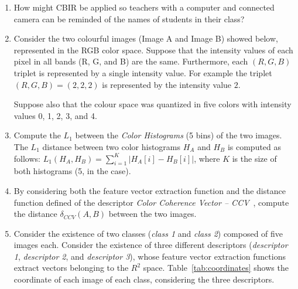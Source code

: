 \begin{enumerate}
\item
How might CBIR be applied so teachers with a computer and connected camera can be reminded of the names of students in their class?

\item Consider the two colourful images (Image A and Image B) showed below, represented in the RGB color space. Suppose that the intensity values of each pixel in all bands (R, G, and B) are the same. Furthermore, each $(R,G,B)$ triplet is represented by a single intensity value. For example the triplet $(R,G,B)= (2,2,2)$ is represented by the intensity value $2$.

Suppose also that the colour space was quantized in five colors with intensity values 0, 1, 2, 3, and 4.

\item Compute the $L_1$ between the {\em Color Histograms} (5
  bins) of the two images. The $L_1$ distance between two color histograms $H_A$ and $H_B$ is computed as follows: $L_1(H_A, H_B) = \sum_{i=1}^{K}|H_A[i]- H_B[i]|$, where $K$ is the size of both histograms (5, in the case).


\item By considering both the feature vector extraction function and the distance function defined of the descriptor {\em Color Coherence Vector -- CCV}~\cite{Burns2006}, compute the distance
  $\delta_{CCV}(A,B)$ between the two images.

\item Consider the existence of two classes ({\em class 1} and {\em
class 2}) composed of five images each. Consider the existence of three different descriptors ({\em descriptor 1}, {\em descriptor 2}, and {\em descriptor 3}), whose feature vector extraction functions extract vectors belonging to the $R^2$ space. 
Table~\ref{tab:coordinates} shows the coordinate of each image of each class, considering the three descriptors.
\end{enumerate}

